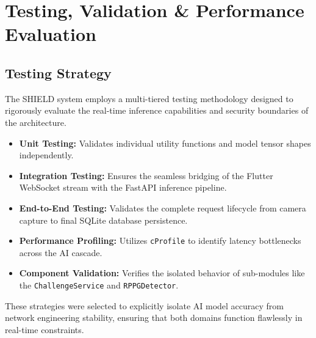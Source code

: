\documentclass[12pt, a4paper]{report}
\begin{document}
\fi
\chapter{Testing, Validation \& Performance Evaluation}

\section{Testing Strategy}
The SHIELD system employs a multi-tiered testing methodology designed to rigorously evaluate the real-time inference capabilities and security boundaries of the architecture.
\begin{itemize}
    \item \textbf{Unit Testing:} Validates individual utility functions and model tensor shapes independently.
    \item \textbf{Integration Testing:} Ensures the seamless bridging of the Flutter WebSocket stream with the FastAPI inference pipeline.
    \item \textbf{End-to-End Testing:} Validates the complete request lifecycle from camera capture to final SQLite database persistence.
    \item \textbf{Performance Profiling:} Utilizes \texttt{cProfile} to identify latency bottlenecks across the AI cascade.
    \item \textbf{Component Validation:} Verifies the isolated behavior of sub-modules like the \texttt{ChallengeService} and \texttt{RPPGDetector}.
\end{itemize}
These strategies were selected to explicitly isolate AI model accuracy from network engineering stability, ensuring that both domains function flawlessly in real-time constraints.
\end{document}
